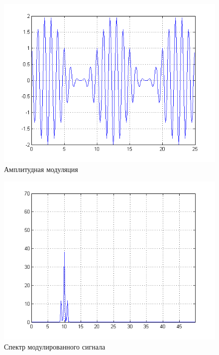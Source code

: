 \documentclass[a4paper, 12pt]{article}
\begin{document}
\begin{figure}[H]
   \includegraphics[scale=0.7]{lab7/AM.png}
   \caption{Амплитудная модуляция}
\end{figure}

\begin{figure}[H]
   \includegraphics[scale=0.7]{lab7/AM_spectro.png}
   \caption{Спектр модулированного сигнала}
\end{figure}
\end{document}
